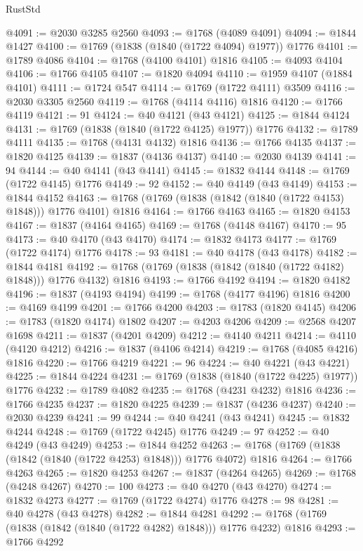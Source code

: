 \begin{lexlean}{RustStd}
\begin{coremodule}
@4091 := @2030 @3285 @2560
@4093 := @1768 (@4089 @4091)
@4094 := @1844 @1427
@4100 := @1769 (@1838 (@1840 (@1722 @4094) @1977)) @1776
@4101 := @1789 @4086
@4104 := @1768 (@4100 @4101) @1816
@4105 := @4093 @4104
@4106 := @1766 @4105
@4107 := @1820 @4094
@4110 := @1959 @4107 (@1884 @4101)
@4111 := @1724 @547
@4114 := @1769 (@1722 @4111) @3509
@4116 := @2030 @3305 @2560
@4119 := @1768 (@4114 @4116) @1816
@4120 := @1766 @4119
@4121 := 91
@4124 := @40 @4121 (@43 @4121)
@4125 := @1844 @4124
@4131 := @1769 (@1838 (@1840 (@1722 @4125) @1977)) @1776
@4132 := @1789 @4111
@4135 := @1768 (@4131 @4132) @1816
@4136 := @1766 @4135
@4137 := @1820 @4125
@4139 := @1837 (@4136 @4137)
@4140 := @2030 @4139
@4141 := 94
@4144 := @40 @4141 (@43 @4141)
@4145 := @1832 @4144
@4148 := @1769 (@1722 @4145) @1776
@4149 := 92
@4152 := @40 @4149 (@43 @4149)
@4153 := @1844 @4152
@4163 := @1768 (@1769 (@1838 (@1842 (@1840 (@1722 @4153) @1848))) @1776 @4101) @1816
@4164 := @1766 @4163
@4165 := @1820 @4153
@4167 := @1837 (@4164 @4165)
@4169 := @1768 (@4148 @4167)
@4170 := 95
@4173 := @40 @4170 (@43 @4170)
@4174 := @1832 @4173
@4177 := @1769 (@1722 @4174) @1776
@4178 := 93
@4181 := @40 @4178 (@43 @4178)
@4182 := @1844 @4181
@4192 := @1768 (@1769 (@1838 (@1842 (@1840 (@1722 @4182) @1848))) @1776 @4132) @1816
@4193 := @1766 @4192
@4194 := @1820 @4182
@4196 := @1837 (@4193 @4194)
@4199 := @1768 (@4177 @4196) @1816
@4200 := @4169 @4199
@4201 := @1766 @4200
@4203 := @1783 (@1820 @4145)
@4206 := @1783 (@1820 @4174) @1802
@4207 := @4203 @4206
@4209 := @2568 @4207 @1698
@4211 := @1837 (@4201 @4209)
@4212 := @4140 @4211
@4214 := @4110 (@4120 @4212)
@4216 := @1837 (@4106 @4214)
@4219 := @1768 (@4085 @4216) @1816
@4220 := @1766 @4219
@4221 := 96
@4224 := @40 @4221 (@43 @4221)
@4225 := @1844 @4224
@4231 := @1769 (@1838 (@1840 (@1722 @4225) @1977)) @1776
@4232 := @1789 @4082
@4235 := @1768 (@4231 @4232) @1816
@4236 := @1766 @4235
@4237 := @1820 @4225
@4239 := @1837 (@4236 @4237)
@4240 := @2030 @4239
@4241 := 99
@4244 := @40 @4241 (@43 @4241)
@4245 := @1832 @4244
@4248 := @1769 (@1722 @4245) @1776
@4249 := 97
@4252 := @40 @4249 (@43 @4249)
@4253 := @1844 @4252
@4263 := @1768 (@1769 (@1838 (@1842 (@1840 (@1722 @4253) @1848))) @1776 @4072) @1816
@4264 := @1766 @4263
@4265 := @1820 @4253
@4267 := @1837 (@4264 @4265)
@4269 := @1768 (@4248 @4267)
@4270 := 100
@4273 := @40 @4270 (@43 @4270)
@4274 := @1832 @4273
@4277 := @1769 (@1722 @4274) @1776
@4278 := 98
@4281 := @40 @4278 (@43 @4278)
@4282 := @1844 @4281
@4292 := @1768 (@1769 (@1838 (@1842 (@1840 (@1722 @4282) @1848))) @1776 @4232) @1816
@4293 := @1766 @4292

\end{coremodule}
\end{lexlean}
